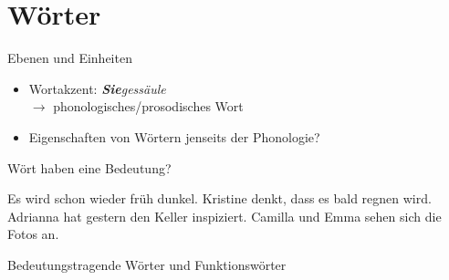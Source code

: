 \section{Wörter}

\begin{frame}
  {Ebenen und Einheiten}
  \pause
  \begin{itemize}[<+->]
    \item Wortakzent: \textit{\alert{\textbf{Sie}}ges\alert{säu}le}\\
      $\rightarrow$ phonologisches\slash prosodisches Wort
      \Zeile
    \item Eigenschaften von Wörtern jenseits der Phonologie?
  \end{itemize}
  \Zeile
  \pause
  \begin{exe}
    \ex
    \begin{xlist}
      \pause
    \end{xlist}
    \pause
    \Zeile
    \ex
    \begin{xlist}
      \pause
    \end{xlist}
  \end{exe}
\end{frame}

\begin{frame}
  {Wört haben eine Bedeutung?}
  \pause
  \begin{exe}
    \ex \alert{Es} \alert{wird} schon wieder früh dunkel.
    \pause
    \ex Kristine denkt, \alert{dass} \alert{es} bald regnen \alert{wird}.
    \pause
    \ex Adrianna \alert{hat} gestern \alert{den} Keller inspiziert.
    \pause
    \ex Camilla \alert{und} Emma sehen \alert{sich} \alert{die} Fotos \alert{an}.
  \end{exe}
  \Zeile
  \pause
  \large
  \alert{Bedeutungstragende Wörter und Funktionswörter}
\end{frame}

